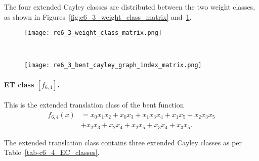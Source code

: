 \documentclass[12pt,a4paper]{article}
\begin{document}
The four extended Cayley classes are distributed between the two weight classes,
as shown in Figures~\ref{fig:c6_3_weight_class_matrix} and~\ref{fig:c6_3_bent_cayley_graph_index_matrix}.

\begin{figure}[!bhpt] %
\centering
\begin{minipage}{.48\textwidth}
  \centering
  \texttt{[image: re6\_3\_weight\_class\_matrix.png]}
  \label{fig:c6_3_weight_class_matrix}
\end{minipage}%
~~~~
\begin{minipage}{.48\textwidth}
  \centering
  \texttt{[image: re6\_3\_bent\_cayley\_graph\_index\_matrix.png]}
  \label{fig:c6_3_bent_cayley_graph_index_matrix}
\end{minipage}
\end{figure}

\paragraph*{ET class $[f_{6,4}]$.}
%
This is the extended translation class of the bent function
\begin{align*}
f_{6,4}(x) &= x_{0} x_{1} x_{2} + x_{0} x_{3} + x_{1} x_{3} x_{4} + x_{1} x_{5} + x_{2} x_{3} x_{5}
\\
           &+ x_{2} x_{3} + x_{2} x_{4} + x_{2} x_{5} + x_{3} x_{4} + x_{3} x_{5}.
\end{align*}

The extended translation class contains three extended Cayley classes as per Table~\ref{tab-c6_4_EC_classes}.
\end{document}

